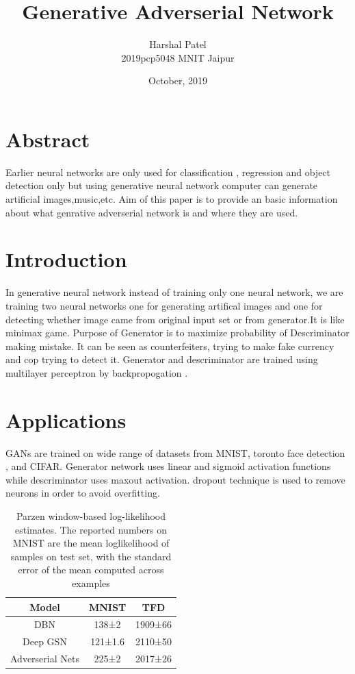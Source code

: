 \documentclass[12pt]{article}
\title{Generative Adverserial Network}
\author{Harshal Patel\\2019pcp5048 MNIT Jaipur}
\date{October, 2019}
\begin{document}
\maketitle

\section*{Abstract}
Earlier neural networks are only used for classification , regression and object detection only but using generative neural network computer can generate artificial images,music,etc. Aim of this paper\cite{GAN} is to provide an basic information about what genrative adverserial network is and where they are used.


\section{Introduction}
In generative neural network instead of training only one neural network, we are training two neural networks one for generating artifical images and one for detecting whether image came from original input set or from generator.It is like minimax game. Purpose of Generator is to maximize probability of Descriminator making mistake.
It can be seen as counterfeiters, trying to make fake currency and cop trying to detect it.
Generator and descriminator are trained using multilayer perceptron by backpropogation .




\section{Applications}
GANs are trained on wide range of datasets from MNIST, toronto face detection , and CIFAR.
Generator network uses linear and sigmoid activation functions while descriminator uses maxout activation. dropout technique is used to remove neurons in order to avoid overfitting. 


\begin{center}


\begin{table}
\begin{tabular}{ c | c | c } 
 \hline
Model & MNIST & TFD\\
 \hline
 DBN & 138±2 & 1909±66\\

Deep GSN & 121±1.6 & 2110±50\\
Adverserial Nets & 225±2 & 2017±26


\end{tabular}
\caption{Parzen window-based log-likelihood estimates. The reported numbers on MNIST are the mean loglikelihood of samples on test set, with the standard error of the mean computed across examples}
\end{table}
\end{center}
\end{document}
